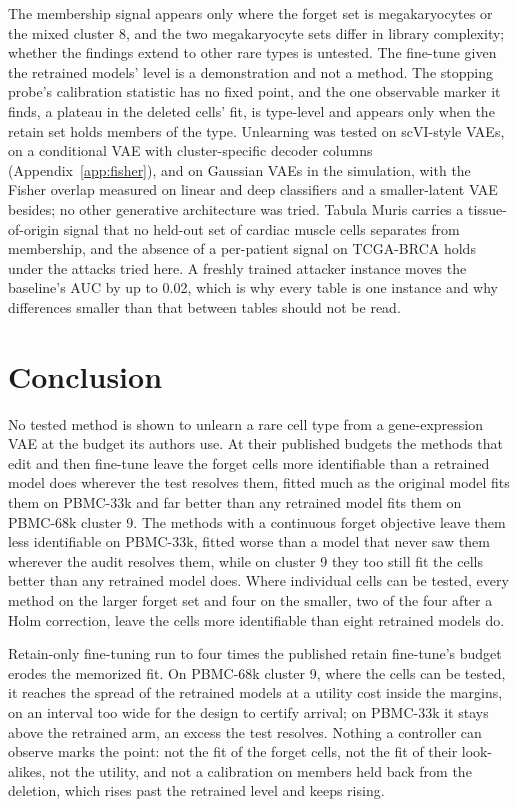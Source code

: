 \documentclass{article}
\begin{document}
The membership signal appears only where the forget set is megakaryocytes or the mixed cluster 8, and the two megakaryocyte sets differ in library complexity; whether the findings extend to other rare types is untested. The fine-tune given the retrained models' level is a demonstration and not a method. The stopping probe's calibration statistic has no fixed point, and the one observable marker it finds, a plateau in the deleted cells' fit, is type-level and appears only when the retain set holds members of the type. Unlearning was tested on scVI-style VAEs, on a conditional VAE with cluster-specific decoder columns (Appendix~\ref{app:fisher}), and on Gaussian VAEs in the simulation, with the Fisher overlap measured on linear and deep classifiers and a smaller-latent VAE besides; no other generative architecture was tried. Tabula Muris carries a tissue-of-origin signal that no held-out set of cardiac muscle cells separates from membership, and the absence of a per-patient signal on TCGA-BRCA holds under the attacks tried here. A freshly trained attacker instance moves the baseline's AUC by up to 0.02, which is why every table is one instance and why differences smaller than that between tables should not be read.

\section{Conclusion}

No tested method is shown to unlearn a rare cell type from a gene-expression VAE at the budget its authors use. At their published budgets the methods that edit and then fine-tune leave the forget cells more identifiable than a retrained model does wherever the test resolves them, fitted much as the original model fits them on PBMC-33k and far better than any retrained model fits them on PBMC-68k cluster 9. The methods with a continuous forget objective leave them less identifiable on PBMC-33k, fitted worse than a model that never saw them wherever the audit resolves them, while on cluster 9 they too still fit the cells better than any retrained model does. Where individual cells can be tested, every method on the larger forget set and four on the smaller, two of the four after a Holm correction, leave the cells more identifiable than eight retrained models do.

Retain-only fine-tuning run to four times the published retain fine-tune's budget erodes the memorized fit. On PBMC-68k cluster 9, where the cells can be tested, it reaches the spread of the retrained models at a utility cost inside the margins, on an interval too wide for the design to certify arrival; on PBMC-33k it stays above the retrained arm, an excess the test resolves. Nothing a controller can observe marks the point: not the fit of the forget cells, not the fit of their look-alikes, not the utility, and not a calibration on members held back from the deletion, which rises past the retrained level and keeps rising.
\end{document}
